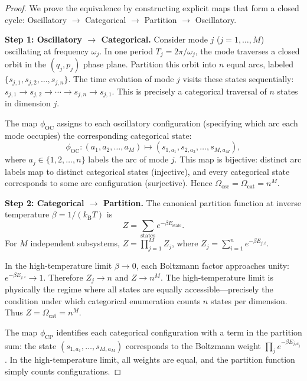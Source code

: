 \documentclass[11pt,twocolumn,a4paper]{article}
\theoremstyle{definition}
\theoremstyle{remark}
\newcommand{\kB}{k_{\mathrm{B}}}
\begin{document}
\begin{proof}
We prove the equivalence by constructing explicit maps that form a closed cycle: Oscillatory $\to$ Categorical $\to$ Partition $\to$ Oscillatory.

\medskip
\noindent\textbf{Step 1: Oscillatory $\to$ Categorical.} Consider mode $j$ ($j = 1, \ldots, M$) oscillating at frequency $\omega_j$. In one period $T_j = 2\pi/\omega_j$, the mode traverses a closed orbit in the $(q_j, p_j)$ phase plane. Partition this orbit into $n$ equal arcs, labeled $\{s_{j,1}, s_{j,2}, \ldots, s_{j,n}\}$. The time evolution of mode $j$ visits these states sequentially: $s_{j,1} \to s_{j,2} \to \cdots \to s_{j,n} \to s_{j,1}$. This is precisely a categorical traversal of $n$ states in dimension $j$.

The map $\phi_{\mathrm{OC}}$ assigns to each oscillatory configuration (specifying which arc each mode occupies) the corresponding categorical state:
\[
  \phi_{\mathrm{OC}}\colon (a_1, a_2, \ldots, a_M) \mapsto (s_{1,a_1}, s_{2,a_2}, \ldots, s_{M,a_M}),
\]
where $a_j \in \{1, 2, \ldots, n\}$ labels the arc of mode $j$. This map is bijective: distinct arc labels map to distinct categorical states (injective), and every categorical state corresponds to some arc configuration (surjective). Hence $\Omega_{\mathrm{osc}} = \Omega_{\mathrm{cat}} = n^M$.

\medskip
\noindent\textbf{Step 2: Categorical $\to$ Partition.} The canonical partition function at inverse temperature $\beta = 1/(\kB T)$ is
\begin{equation}\label{eq:partition-sum}
  Z = \sum_{\text{states}} e^{-\beta E_{\text{state}}}.
\end{equation}
For $M$ independent subsystems, $Z = \prod_{j=1}^{M} Z_j$, where $Z_j = \sum_{i=1}^{n} e^{-\beta E_{j,i}}$.

In the high-temperature limit $\beta \to 0$, each Boltzmann factor approaches unity: $e^{-\beta E_{j,i}} \to 1$. Therefore $Z_j \to n$ and $Z \to n^M$. The high-temperature limit is physically the regime where all states are equally accessible---precisely the condition under which categorical enumeration counts $n$ states per dimension. Thus $Z = \Omega_{\mathrm{cat}} = n^M$.

The map $\phi_{\mathrm{CP}}$ identifies each categorical configuration with a term in the partition sum: the state $(s_{1,a_1}, \ldots, s_{M,a_M})$ corresponds to the Boltzmann weight $\prod_j e^{-\beta E_{j,a_j}}$. In the high-temperature limit, all weights are equal, and the partition function simply counts configurations.


\end{proof}
\end{document}
